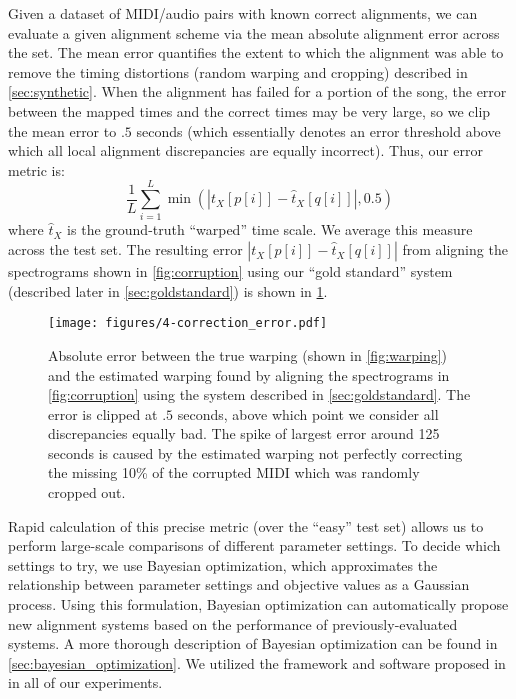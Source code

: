 Given a dataset of MIDI/audio pairs with known correct alignments, we can evaluate a given alignment scheme via the mean absolute alignment error across the set.
The mean error quantifies the extent to which the alignment was able to remove the timing distortions (random warping and cropping) described in \cref{sec:synthetic}.
When the alignment has failed for a portion of the song, the error between the mapped times and the correct times may be very large, so we clip the mean error to $.5$ seconds (which essentially denotes an error threshold above which all local alignment discrepancies are equally incorrect).  Thus, our error metric is:
\begin{equation}
\frac{1}{L}\sum_{i = 1}^{L} \min(|t_X[p[i]] - \hat{t}_X[q[i]]|, 0.5)
\end{equation}
where $\hat{t}_X$ is the ground-truth ``warped'' time scale.  We average this measure across the test set.
The resulting error $|t_X[p[i]] - \hat{t}_X[q[i]]|$ from aligning the spectrograms shown in \cref{fig:corruption} using our ``gold standard'' system (described later in \cref{sec:goldstandard}) is shown in \cref{fig:correction_error}.

\begin{figure}
  \centering
  \texttt{[image: figures/4-correction\_error.pdf]}
  \caption[Absolute error from correcting synthetic warping]{Absolute error between the true warping (shown in \cref{fig:warping}) and the estimated warping found by aligning the spectrograms in \cref{fig:corruption} using the system described in \cref{sec:goldstandard}.
The error is clipped at $.5$ seconds, above which point we consider all discrepancies equally bad.
The spike of largest error around 125 seconds is caused by the estimated warping not perfectly correcting the missing 10\% of the corrupted MIDI which was randomly cropped out.}
  \label{fig:correction_error}
\end{figure}

Rapid calculation of this precise metric (over the ``easy'' test set) allows us to perform large-scale comparisons of different parameter settings.
To decide which settings to try, we use Bayesian optimization, which approximates the relationship between parameter settings and objective values as a Gaussian process.
Using this formulation, Bayesian optimization can automatically propose new alignment systems based on the performance of previously-evaluated systems.
A more thorough description of Bayesian optimization can be found in \cref{sec:bayesian_optimization}.
We utilized the framework and software proposed in \cite{snoek2012practical} in all of our experiments.

